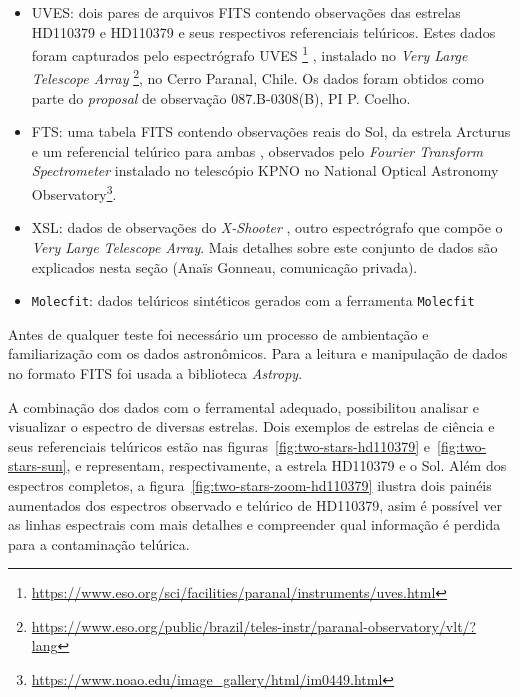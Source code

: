 \begin{itemize}
    \item UVES: dois pares de arquivos FITS contendo observações das estrelas HD110379 e HD110379 e seus respectivos referenciais telúricos. Estes dados foram capturados pelo espectrógrafo UVES \footnote{\url{https://www.eso.org/sci/facilities/paranal/instruments/uves.html}} \citep{2000SPIE.4008..534D}, instalado no \textit{Very Large Telescope Array} \footnote{\url{https://www.eso.org/public/brazil/teles-instr/paranal-observatory/vlt/?lang}}, no Cerro Paranal, Chile. Os dados foram obtidos como parte do \textit{proposal} de observação 087.B-0308(B), PI P. Coelho.
    \item FTS: uma tabela FITS contendo observações reais do Sol, da estrela Arcturus e um referencial telúrico para ambas \citep{arcturusflux:hinkle00}, observados pelo \textit{Fourier Transform Spectrometer} instalado no telescópio KPNO no National Optical Astronomy Observatory\footnote{\url{https://www.noao.edu/image_gallery/html/im0449.html}}.
    \item XSL: dados de observações do \textit{X-Shooter} \citep{Chen2014TheXS, unpublished-xshooter-data-release}, outro espectrógrafo que compõe o \textit{Very Large Telescope Array}. Mais detalhes sobre este conjunto de dados são explicados nesta seção (Anaïs Gonneau, comunicação privada).
    \item\texttt{Molecfit}: dados telúricos sintéticos gerados com a ferramenta \texttt{Molecfit} \citep{smette2015molecfit} 
\end{itemize}

Antes de qualquer teste foi necessário um processo de ambientação e familiarização com os dados astronômicos. Para a leitura e manipulação de dados no formato FITS foi usada a biblioteca \textit{Astropy}.

A combinação dos dados com o ferramental adequado, possibilitou analisar e visualizar o espectro de diversas estrelas. Dois exemplos de estrelas de ciência e seus referenciais telúricos estão nas figuras~\ref{fig:two-stars-hd110379} e~\ref{fig:two-stars-sun}, e representam, respectivamente, a estrela HD110379 e o Sol. Além dos espectros completos, a figura~\ref{fig:two-stars-zoom-hd110379} ilustra dois painéis aumentados dos espectros observado e telúrico de HD110379, asim é possível ver as linhas espectrais com mais detalhes e compreender qual informação é perdida para a contaminação telúrica.

